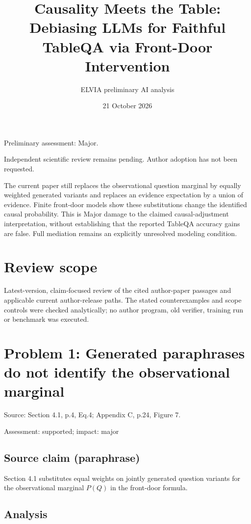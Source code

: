 \documentclass[11pt]{article}
\begin{document}
\title{Causality Meets the Table: Debiasing LLMs for Faithful TableQA via Front-Door Intervention}

\author{ELVIA preliminary AI analysis}\date{21 October 2026}\maketitle

Preliminary assessment: Major.\par

Independent scientific review remains pending. Author adoption has not been requested.

The current paper still replaces the observational question marginal by equally weighted generated variants and replaces an evidence expectation by a union of evidence. Finite front-door models show these substitutions change the identified causal probability. This is Major damage to the claimed causal-adjustment interpretation, without establishing that the reported TableQA accuracy gains are false. Full mediation remains an explicitly unresolved modeling condition.

\section*{Review scope}

Latest-version, claim-focused review of the cited author-paper passages and applicable current author-release paths. The stated counterexamples and scope controls were checked analytically; no author program, old verifier, training run or benchmark was executed.

\section*{Problem 1: Generated paraphrases do not identify the observational marginal}

Source: Section 4.1, p.4, Eq.4; Appendix C, p.24, Figure 7.

Assessment: supported; impact: major

\subsection*{Source claim (paraphrase)}

Section 4.1 substitutes equal weights on jointly generated question variants for the observational marginal \(P(Q)\) in the front-door formula.

\subsection*{Analysis}
\end{document}
